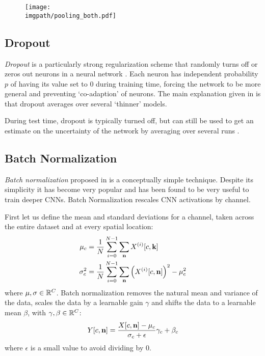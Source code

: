 \begin{figure}
  \centering
  \texttt{[image: \\imgpath/pooling\_both.pdf]}
  \label{fig:ch2:maxpool}
\end{figure}

\subsection{Dropout}
\emph{Dropout} is a particularly strong regularization scheme that randomly turns off
or zeros out neurons in a neural network \cite{hinton_improving_2012, srivastava_dropout:_2014}.
Each neuron has independent probability $p$ of having its value set to 0 during training
time, forcing the network to be more general and preventing `co-adaption' of
neurons. The main explanation given in \cite{srivastava_dropout:_2014} is
that dropout averages over several `thinner' models.

During test time, dropout is typically turned off, but can still be
used to get an estimate on the uncertainty of the network by averaging over
several runs \cite{gal_dropout_2016}.

\subsection{Batch Normalization}
\emph{Batch normalization} proposed in \cite{ioffe_batch_2015} is a conceptually 
simple technique. Despite its simplicity it has become very popular and has been found
to be very useful to train deeper CNNs. Batch Normalization rescales CNN activations by channel. 

First let us define the mean and standard deviations for a channel, taken across
the entire dataset and at every spatial location:
\begin{align}
  \mu_c &= \frac{1}{N}\sum_{i=0}^{N-1} \sum_\nn X^{(i)}[c, \kk] \\
  \sigma_c^2 &=  \frac{1}{N} \sum_{i=0}^{N-1} \sum_\nn \left(X^{(i)}[c, \nn]\right)^2 - \mu^2_c 
\end{align}
where $\mu, \sigma \in \reals[C]$.
Batch normalization removes the natural mean and variance of the data, scales the data
by a learnable gain $\gamma$ and shifts the data to a learnable mean $\beta$,
with $\gamma, \beta \in \reals[C]$:
\begin{equation}
  Y[c, \nn] = \frac{X[c, \nn] - \mu_c}{\sigma_c + \epsilon}\gamma_c + \beta_c
\end{equation}
where $\epsilon$ is a small value to avoid dividing by 0.

